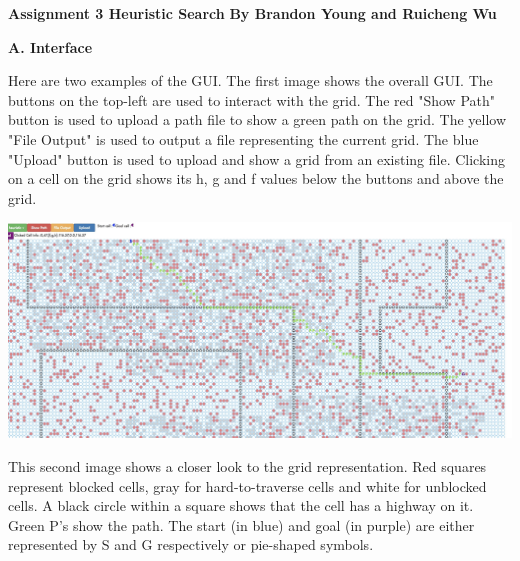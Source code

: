 \documentclass[12pt, letterpaper]{article}
\begin{document}
\noindent \textbf{\large Assignment 3 Heuristic Search }\newline
\noindent \textbf{By Brandon Young and Ruicheng Wu}

\bigskip

\noindent \textbf{A. Interface}

Here are two examples of the GUI. The first image shows the overall GUI. The buttons on the top-left are used to interact with the grid. The red "Show Path" button is used to upload a path file to show a green path on the grid. The yellow "File Output" is used to output a file representing the current grid. The blue "Upload" button is used to upload and show a grid from an existing file. Clicking on a cell on the grid shows its h, g and f values below the buttons and above the grid.

\medskip

\includegraphics[scale=0.30]{"a-map1-0"}

\medskip 

This second image shows a closer look to the grid representation. Red squares represent blocked cells, gray for hard-to-traverse cells and white for unblocked cells. A black circle within a square shows that the cell has a highway on it. Green P's show the path. The start (in blue) and goal (in purple) are either represented by S and G respectively or pie-shaped symbols.

\medskip
\end{document}
